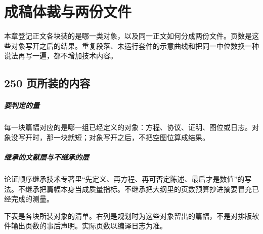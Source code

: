 \chapter{成稿体裁与两份文件}
\label{ch:deliver}

本章登记正文各块装的是哪一类对象，以及同一正文如何分成两份文件。页数是这些对象写开之后的结果。重复段落、未运行套件的示意曲线和把同一中位数换一种说法再写一遍，都不增加技术内容。

\section{250 页所装的内容}

\paragraph{要判定的量}
每一块篇幅对应的是哪一组已经定义的对象：方程、协议、证明、图位或日志。对象没写开时，那一块就短；对象写开之后，不把空图位算成结果。

\paragraph{继承的文献层与不继承的层}
论证顺序继承技术专著里“先定义、再方程、再可否定陈述、最后才是数值”的写法。不继承把篇幅本身当成质量指标。不继承把大纲里的页数预算抄进摘要冒充已经完成的测量。

下表是各块所装对象的清单。右列是规划时为这些对象留出的篇幅，不是对排版软件输出页数的事后声明。实际页数以编译日志为准。


